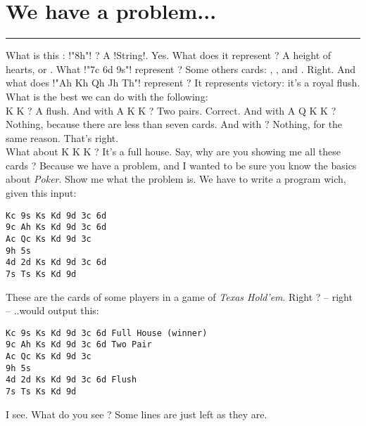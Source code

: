 \newpage
\section{We have a problem...} %
\vspace{10cm}
\hrule

\lhQ What is this : \il!"8h"! ?
\lhA A \il!String!.
\lhN Yes. What does it represent ?
\lhA A height of hearts, or .
\lhN What \il!"7c 6d 9s"! represent ?
\lhA Some others cards: , , and .
\lhN Right. And what does \il!"Ah Kh Qh Jh Th"! represent ?
\lhA It represents victory: it's a royal flush.
\lhN What is the best we can do with the following: \\
   \spades K \diamonds K    ?
\lhA A flush.
\lhN And with  \hearts A \spades K \diamonds K    ?
\lhA Two pairs.
\lhN Correct. And with \clubs A \clubs Q \spades K \diamonds K   ?
\lhA Nothing, because there are less than seven cards.
\lhN And with   ?
\lhA Nothing, for the same reason.
\lhN That's right. \\
What about \clubs K  \spades K \diamonds K     ?
\lhA It's a full house. Say, why are you showing me all these cards ?
\lhN Because we have a problem, and I wanted to be sure you know the basics about \emph{Poker}.
\lhA Show me what the problem is.
\lhN We have to write a program wich, given this input:
\begin{verbatim}
Kc 9s Ks Kd 9d 3c 6d
9c Ah Ks Kd 9d 3c 6d
Ac Qc Ks Kd 9d 3c
9h 5s
4d 2d Ks Kd 9d 3c 6d
7s Ts Ks Kd 9d
\end{verbatim}
\hspace*{\fill} 
\lhA These are the cards of some players in a game of \emph{Texas Hold'em}. Right ?
\lhN -- right -- ..would output this:
\begin{verbatim}
Kc 9s Ks Kd 9d 3c 6d Full House (winner)
9c Ah Ks Kd 9d 3c 6d Two Pair
Ac Qc Ks Kd 9d 3c 
9h 5s 
4d 2d Ks Kd 9d 3c 6d Flush
7s Ts Ks Kd 9d 
\end{verbatim}
\hspace*{\fill} 
\lhA I see. 
\lhN What do you see ?
\lhA Some lines are just left as they are. \\
